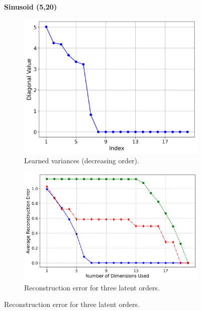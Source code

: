 \begin{figure}[htbp]
    \vspace{1em}

    \textbf{Sinusoid (5,20)} \par\vspace{0.4em}
    \begin{subfigure}[t]{0.43\textwidth}
        \centering
        \includegraphics[width=\linewidth]{Chapter5/results/visualisations/RAE/reconstruction/sinusoid_5_20/diagonal_values_normal_scale.png}
        \caption{Learned variances (decreasing order).}
        \label{fig:sinusoid_variances}
    \end{subfigure}
    \hfill
    \begin{subfigure}[t]{0.53\textwidth}
        \centering
        \includegraphics[width=\linewidth]{Chapter5/results/visualisations/RAE/reconstruction/sinusoid_5_20/reconstruction_error_plot_normal_scale.png}
        \caption{Reconstruction error for three latent orders.}
        \label{fig:sinusoid_reconstruction_errors}
    \end{subfigure}


\end{figure}
